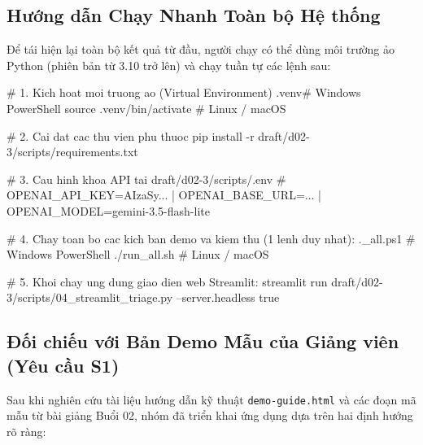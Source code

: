 \documentclass[11pt,a4paper]{article}
\begin{document}
\subsection{Hướng dẫn Chạy Nhanh Toàn bộ Hệ thống}

Để tái hiện lại toàn bộ kết quả từ đầu, người chạy có thể dùng môi trường ảo Python (phiên bản từ 3.10 trở lên) và chạy tuần tự các lệnh sau:

\begin{terminalcode}
# 1. Kich hoat moi truong ao (Virtual Environment)
.venv\Scripts\activate          # Windows PowerShell
source .venv/bin/activate       # Linux / macOS

# 2. Cai dat cac thu vien phu thuoc
pip install -r draft/d02-3/scripts/requirements.txt

# 3. Cau hinh khoa API tai draft/d02-3/scripts/.env
# OPENAI_API_KEY=AIzaSy... | OPENAI_BASE_URL=... | OPENAI_MODEL=gemini-3.5-flash-lite

# 4. Chay toan bo cac kich ban demo va kiem thu (1 lenh duy nhat):
.\run_all.ps1                  # Windows PowerShell
./run_all.sh                   # Linux / macOS

# 5. Khoi chay ung dung giao dien web Streamlit:
streamlit run draft/d02-3/scripts/04_streamlit_triage.py --server.headless true
\end{terminalcode}

\subsection{Đối chiếu với Bản Demo Mẫu của Giảng viên (Yêu cầu S1)}

Sau khi nghiên cứu tài liệu hướng dẫn kỹ thuật \texttt{demo-guide.html} và các đoạn mã mẫu từ bài giảng Buổi 02, nhóm đã triển khai ứng dụng dựa trên hai định hướng rõ ràng:
\end{document}
